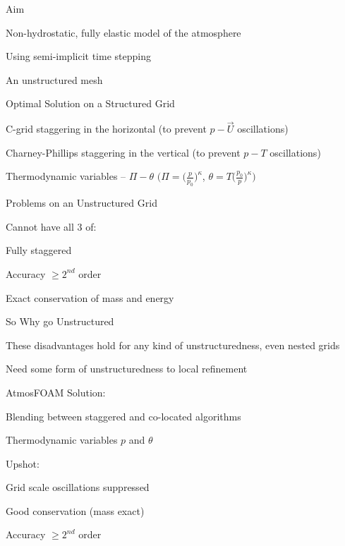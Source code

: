\begin{slide}{}

{\large\color{purple} Aim}
\begin{list0}
\item Non-hydrostatic, fully elastic model of the atmosphere
\item Using semi-implicit time stepping
\item An unstructured mesh\pause
\end{list0}

{\large\color{purple} Optimal Solution on a Structured Grid}
\begin{list0}
\item C-grid staggering in the horizontal (to prevent $p-\vec{U}$ oscillations)
\item Charney-Phillips staggering in the vertical (to prevent $p-T$ oscillations)
\item Thermodynamic variables -- $\Pi - \theta$
$\biggl(\Pi = \bigl(\frac{p}{p_0}\bigr)^\kappa$,
$\theta = T\bigl(\frac{p_0}{p}\bigr)^\kappa\biggl)$\pause
\end{list0}

{\large\color{purple} Problems on an Unstructured Grid}

Cannot have all 3 of:
\begin{list0}
\item Fully staggered
\item Accuracy $\ge 2^{nd}$ order
\item Exact conservation of mass and energy
\end{list0}

\end{slide}

\begin{slide}{}

{\large\color{purple} So Why go Unstructured}
\begin{list0}
\item These disadvantages hold for any kind of unstructuredness, even nested grids
\item Need some form of unstructuredness to local refinement\pause
\end{list0}

{\large\color{purple} AtmosFOAM Solution:}
\begin{list0}
\item Blending between staggered and co-located algorithms
\item Thermodynamic variables $p$ and $\theta$
\end{list0}
Upshot:
\begin{list0}
\item Grid scale oscillations suppressed
\item Good conservation (mass exact)
\item Accuracy $\ge 2^{nd}$ order
\end{list0}


\end{slide}

